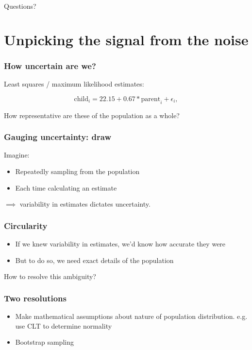 \documentclass[handout]{beamer}
\begin{document}
\begin{frame}
	
	\Large Questions?
\end{frame}

\section{Unpicking the signal from the noise}
\frame{\tableofcontents[currentsection]}

\begin{frame}
	\frametitle{How uncertain are we?}
	
	Least squares / maximum likelihood estimates:
	
	\begin{equation}
	\text{child}_i = 22.15 + 0.67 * \text{parent}_i + \epsilon_i,
	\end{equation}
	
	How representative are these of the population as a whole?
	
\end{frame}

\begin{frame}
	\frametitle{Gauging uncertainty: draw}
	
	Imagine:
	
	\begin{itemize}
		\item Repeatedly sampling from the population
		\item Each time calculating an estimate
	\end{itemize}
	
	$\implies$ variability in estimates dictates uncertainty.
	
\end{frame}

\begin{frame}
	\frametitle{Circularity}
	
	\begin{itemize}
		\item If we knew variability in estimates, we'd know how accurate they were
		\item But to do so, we need exact details of the population
	\end{itemize}
	
	How to resolve this ambiguity?
	
\end{frame}

\begin{frame}
	\frametitle{Two resolutions}
	
	\begin{itemize}
		\item Make mathematical assumptions about nature of population distribution. e.g. use CLT to determine normality
		\item Bootstrap sampling
	\end{itemize}
	
\end{frame}
\end{document}
